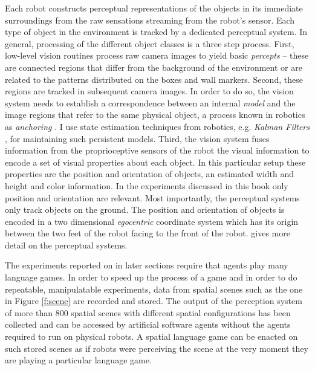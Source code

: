 Each robot constructs perceptual representations of the objects in its
immediate surroundings from the raw sensations streaming from the
robot's sensor. Each type of object in the environment is tracked
by a dedicated perceptual system. In general, processing of 
the different object classes is  a three step process.
First, low-level vision routines process raw camera
images to yield basic \emph{percepts} -- these are connected regions that
differ from the background of the environment or are related to 
the patterns distributed on the boxes and wall markers.
Second, these regions are tracked in subsequent
camera images. In order to do so, the vision system needs to establish a
correspondence between an internal \emph{model} and the image
regions that refer to the same physical object, a process known in
robotics as \emph{anchoring} \citep{coradeschi2003anchoring}. 
I use state estimation techniques from robotics, e.g. \emph{Kalman Filters} 
\citep{kalman1960linear}, 
for maintaining such persistent models. Third, the vision system 
fuses information from the proprioceptive sensors of the robot
the visual information to encode a set of visual properties about each object. 
In this particular setup these properties are the position and orientation of objects, 
an estimated width and height and color information. In the experiments 
discussed in this book only position and orientation are relevant. 
Most importantly, the perceptual systems only track objects on the ground. 
The position and orientation of objects is encoded in 
a two dimensional \emph{egocentric} coordinate system which has 
its origin between the two feet of the robot facing to the front of the 
robot. \cite{spranger2008grounded} gives more detail on the 
perceptual systems.

The experiments reported on in later sections require that agents play many
language games. In order to speed up the process of a game and in order to
do repeatable, manipulatable experiments, data from spatial scenes  such as the one 
in Figure \ref{f:scene} are recorded and stored. The output of the perception
system of more than 800 spatial scenes with different spatial configurations 
has been collected and can be accessed by artificial software agents without 
the agents required to run on physical robots.
A spatial language game can be enacted on such stored scenes as if robots 
were perceiving the scene at the very moment they are playing a particular 
language game.

